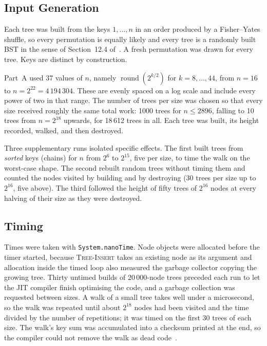 \documentclass[conference]{IEEEtran}
\newcommand{\INS}{\textsc{Tree-Insert}}
\begin{document}
\subsection{Input Generation}

Each tree was built from the keys $1, \dots, n$ in an order produced by a
Fisher--Yates shuffle, so every permutation is equally likely and every tree
is a randomly built BST in the sense of Section~12.4 of~\cite{clrs}. A fresh permutation was
drawn for every tree. Keys are distinct by construction.

Part~A used 37 values of $n$, namely $\operatorname{round}(2^{k/2})$ for
$k = 8, \dots, 44$, from $n = 16$ to $n = 2^{22} = 4\,194\,304$. These are
evenly spaced on a log scale and include every power of two in that range.
The number of trees per size was chosen so that every size received roughly
the same total work: 1000 trees for $n \le 2896$, falling to 10 trees from
$n = 2^{18}$ upwards, for 18\,612 trees in all. Each tree was built, its height
recorded, walked, and then destroyed.

Three supplementary runs isolated specific effects. The first built trees from
\emph{sorted} keys (chains) for $n$ from $2^6$ to $2^{15}$, five per size, to
time the walk on the worst-case shape. The second rebuilt random trees without
timing them and counted the nodes visited by building and by destroying
(30 trees per size up to $2^{16}$, five above). The third followed the height
of fifty trees of $2^{16}$ nodes at every halving of their size as they were
destroyed.

\subsection{Timing}

Times were taken with \texttt{System.nanoTime}. Node objects were allocated
before the timer started, because \INS{} takes an existing node as its
argument and allocation inside the timed loop also measured the garbage
collector copying the growing tree. Thirty untimed builds of 20\,000-node trees
preceded each run to let the JIT compiler finish optimising the code, and a
garbage collection was requested between sizes. A walk of a small tree takes
well under a microsecond, so the walk was repeated until about $2^{18}$ nodes
had been visited and the time divided by the number of repetitions; it was
timed on the first 30 trees of each size. The walk's key sum was accumulated
into a checksum printed at the end, so the compiler could not remove the walk
as dead code~\cite{georges}.
\end{document}
